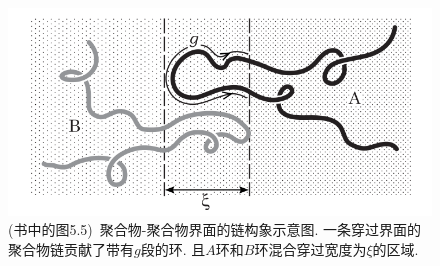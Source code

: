 \label{subsec.figure}
\begin{figure}[htbp]
    \centering
    \centerline{\includegraphics[scale=0.4]{./Contents/chapter5/figures/fig5.png}}
    \caption{(书中的图5.5)\ 聚合物-聚合物界面的链构象示意图.
    一条穿过界面的聚合物链贡献了带有$g$段的环.
    且$A$环和$B$环混合穿过宽度为$\xi$的区域.}
	\label{fig.2}
\end{figure}



